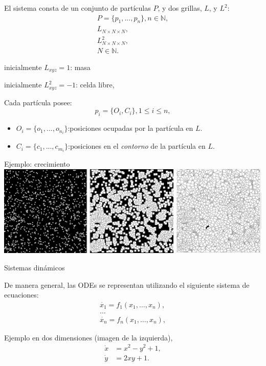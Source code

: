 \documentclass[spanish]{beamer}
\begin{document}
\begin{frame}
El sistema consta de un conjunto de partículas $P$, y dos grillas, $L$, y $L^{2}$:
\begin{align*}
  P = \{p_{1}, ... , p_{n}\}, n  \in \mathbb{N}, \\
  L_{N\times N \times N},\\
  L^{2}_{N\times N \times N},\\ N \in \mathbb{N}.
\end{align*}

inicialmente $L_{xyz}=1$: masa

inicialmente $L^{2}_{xyz}=-1$: celda libre,

Cada partícula posee:
\begin{equation*}
  p_{i} = \{O_{i}, C_{i}\}, 1 \le i \le n,
\end{equation*}

\begin{itemize}
\item $O_{i} = \{o_{1}, ... , o_{n_{i}}\}$:posiciones ocupadas por la part\'icula en $L$.

\item $C_{i} = \{c_{1}, ... , c_{m_{i}}\}$:posiciones en el {\em contorno} de la part\'icula en $L$.
\end{itemize}

\end{frame}

\begin{frame}{Ejemplo: crecimiento}
\includegraphics[scale = 0.15]{../figures/modeladocrec}
\end{frame}


\begin{frame}{Sistemas dinámicos}

De manera general, las ODEs se representan utilizando el siguiente sistema de ecuaciones:
\begin{equation*}
  \begin{aligned}
    \dot{x_{1}} = f_{1}(x_{1},\ldots,x_{n}),\\
    \ldots\\
    \dot{x_{n}} = f_{n}(x_{1},\ldots,x_{n}),
  \end{aligned}
\end{equation*}

Ejemplo en dos dimensiones (imagen de la izquierda),
\begin{equation*} \label{eq:simple}  
  \begin{aligned}
    \dot{x} &= x^{2}-y^{2}+1,\\
    \dot{y} &= 2xy+1.
  \end{aligned}
\end{equation*}

\end{frame}
\end{document}
